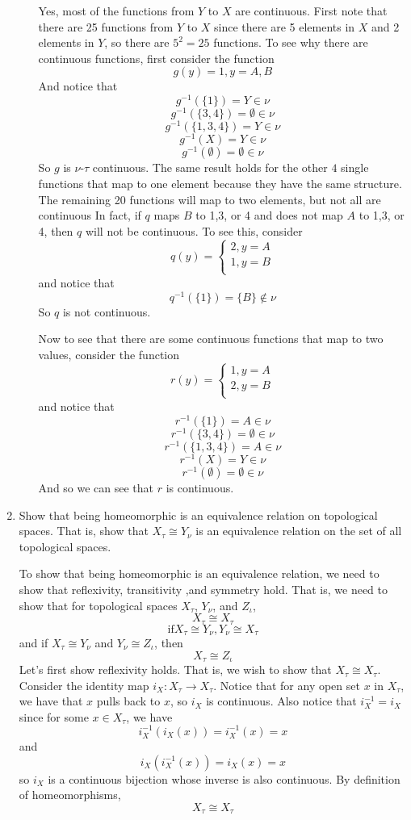 \documentclass[12pt]{article}
\begin{document}
\begin{enumerate}
\begin{enumerate}
Yes, most of the functions from $Y$ to $X$ are continuous. First note that there are 25 functions from $Y$ to $X$ since there are 5 elements in $X$ and 2 elements in $Y$, so there are $5^2 = 25$ functions. To see why there are continuous functions, first consider the function
\[g(y) = 1, y = A,B\]
And notice that
\[g^{-1}(\{1\}) = Y \in \nu\]
\[g^{-1}(\{3,4\}) = \emptyset \in \nu\]
\[g^{-1}(\{1,3,4\}) = Y \in \nu\]
\[g^{-1}(X) = Y \in \nu\]
\[g^{-1}(\emptyset) = \emptyset \in \nu\]
So $g$ is $\nu$-$\tau$ continuous. The same result holds for the other $4$ single functions that map to one element because they have the same structure. The remaining 20 functions will map to two elements, but not all are continuous In fact, if $q$ maps $B$ to 1,3, or 4 and does not map $A$ to 1,3, or 4, then $q$ will not be continuous. To see this, consider
\[q(y) = \begin{cases}
        2, y = A\\
        1, y = B\\
\end{cases}\]
and notice that
\[q^{-1}(\{1\}) = \{B\} \notin \nu\]
So $q$ is not continuous.

Now to see that there are some continuous functions that map to two values, consider the function 
\[r(y) = \begin{cases}
        1, y = A\\
        2, y = B\\
\end{cases}\]
and notice that
\[r^{-1}(\{1\}) = A \in \nu\]
\[r^{-1}(\{3,4\}) = \emptyset \in \nu\]
\[r^{-1}(\{1,3,4\}) = A \in \nu\]
\[r^{-1}(X) = Y \in \nu\]
\[r^{-1}(\emptyset) = \emptyset \in \nu\]
And so we can see that $r$ is continuous.
\end{enumerate} 

\item Show that being homeomorphic is an equivalence relation on topological spaces. That is, show that $X_{\tau}\cong Y_{\nu}$ is an equivalence relation on the set of all topological spaces.

To show that being homeomorphic is an equivalence relation, we need to show that reflexivity, transitivity ,and symmetry hold. That is, we need to show that for topological spaces $X_{\tau}$, $Y_{\nu}$, and $Z_{\iota}$,
\[X_{\tau} \cong X_{\tau}\]
\[\text{if} X_{\tau} \cong Y_{\nu}, Y_{\nu} \cong X_{\tau}\]
and if $X_{\tau} \cong Y_{\nu}$ and $Y_{\nu} \cong Z_{\iota}$, then
\[X_{\tau} \cong Z_{\iota}\]
Let's first show reflexivity holds. That is, we wish to show that $X_{\tau} \cong X_{\tau}$. Consider the identity map $i_X : X_{\tau} \to X_{\tau}$. Notice that for any open set $x$ in $X_{\tau}$, we have that $x$ pulls back to $x$, so $i_X$ is continuous. Also notice that $i_X^{-1} = i_X$ since for some $x \in X_{\tau}$, we have 
\[i_X^{-1}(i_X(x)) = i_X^{-1}(x) = x\]
and 
\[i_X(i_X^{-1}(x)) = i_X(x) = x\]
so $i_X$ is a continuous bijection whose inverse is also continuous. By definition of homeomorphisms, 
\[X_{\tau} \cong X_{\tau}\]


\end{enumerate}
\end{document}
